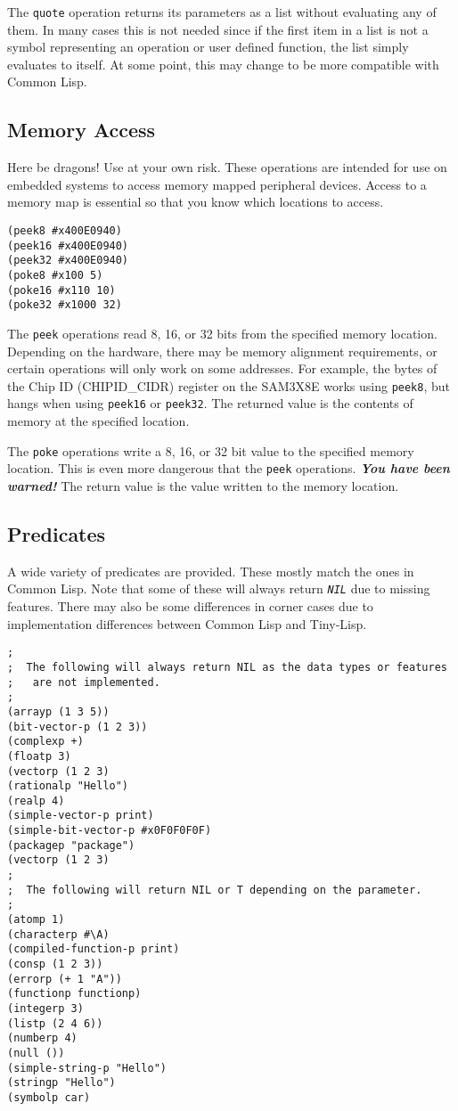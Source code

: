\documentclass[10pt, openany]{book}
\newcommand{\function}[1]{\texttt{#1}}
\newcommand{\constant}[1]{\emph{\texttt{#1}}}
\newcommand{\tl}{Tiny-Lisp}
\newcommand{\cl}{Common Lisp}
\begin{document}
The \function{quote} operation returns its parameters as a list without evaluating any of them.  In many cases this is not needed since if the first item in a list is not a symbol representing an operation or user defined function, the list simply evaluates to itself.  At some point, this may change to be more compatible with \cl.

\subsection{Memory Access}
Here be dragons!  Use at your own risk.  These operations are intended for use on embedded systems to access memory mapped peripheral devices.  Access to a memory map is essential so that you know which locations to access.
\begin{lstlisting}
(peek8 #x400E0940)
(peek16 #x400E0940)
(peek32 #x400E0940)
(poke8 #x100 5)
(poke16 #x110 10)
(poke32 #x1000 32)
\end{lstlisting}

The \function{peek} operations read 8, 16, or 32 bits from the specified memory location.  Depending on the hardware, there may be memory alignment requirements, or certain operations will only work on some addresses.  For example, the bytes of the Chip ID (CHIPID\_CIDR) register on the SAM3X8E works using \function{peek8}, but hangs when using \function{peek16} or \function{peek32}.  The returned value is the contents of memory at the specified location.

The \function{poke} operations write a 8, 16, or 32 bit value to the specified memory location.  This is even more dangerous that the \function{peek} operations.  \textbf{\textit{You have been warned!}}  The return value is the value written to the memory location.

\subsection{Predicates}
A wide variety of predicates are provided.  These mostly match the ones in \cl{}.  Note that some of these will always return \constant{NIL} due to missing features.  There may also be some differences in corner cases due to implementation differences between \cl{} and \tl.

\begin{lstlisting}
;
;  The following will always return NIL as the data types or features
;   are not implemented.
;
(arrayp (1 3 5))
(bit-vector-p (1 2 3))
(complexp +)
(floatp 3)
(vectorp (1 2 3)
(rationalp "Hello")
(realp 4)
(simple-vector-p print)
(simple-bit-vector-p #x0F0F0F0F)
(packagep "package")
(vectorp (1 2 3)
;
;  The following will return NIL or T depending on the parameter.
;
(atomp 1)
(characterp #\A)
(compiled-function-p print)
(consp (1 2 3))
(errorp (+ 1 "A"))
(functionp functionp)
(integerp 3)
(listp (2 4 6))
(numberp 4)
(null ())
(simple-string-p "Hello")
(stringp "Hello")
(symbolp car)
\end{lstlisting}
\end{document}
